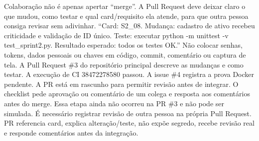 
 Colaboração não é apenas apertar ``merge''. A Pull Request deve deixar claro o que mudou, como testar e qual card/requisito ela atende, para que outra pessoa consiga revisar sem adivinhar.
 ``Card: S2\_08. Mudança: cadastro de ativo recebeu criticidade e validação de ID único. Teste: executar python -m unittest -v test\_sprint2.py. Resultado esperado: todos os testes OK.'' Não colocar senhas, tokens, dados pessoais ou chaves em código, commit, comentário ou captura de tela.
 A Pull Request \#3 do repositório principal descreve as mudanças e como testar. A execução de CI 38472278580 passou. A issue \#4 registra a prova Docker pendente. A PR está em rascunho para permitir revisão antes de integrar.
 O checklist pede aprovação ou comentário de um colega e resposta aos comentários antes do merge. Essa etapa ainda não ocorreu na PR \#3 e não pode ser simulada. É necessário registrar revisão de outra pessoa na própria Pull Request.
 PR referencia card, explica alteração/teste, não expõe segredo, recebe revisão real e responde comentários antes da integração.

